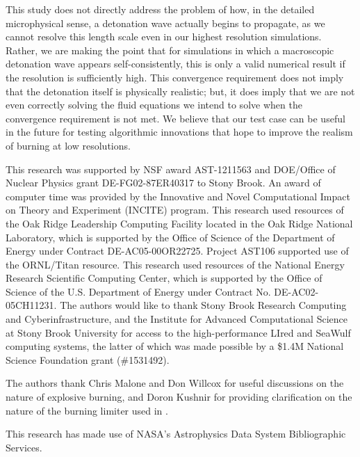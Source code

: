 \documentclass[twocolumn,numberedappendix,trackchanges]{../aastex62}
\newcommand{\amrex}{\texttt{AMReX}}
\newcommand{\castro}{\texttt{CASTRO}}
\newcommand{\yt}{\texttt{yt}}
\begin{document}
This study does not directly address the problem of how, in the detailed
microphysical sense, a detonation wave actually begins to propagate, as
we cannot resolve this length scale even in our highest resolution simulations.
Rather, we are making the point that for simulations in which a macroscopic
detonation wave appears self-consistently, this is only a valid numerical result
if the resolution is sufficiently high. This convergence requirement does
not imply that the detonation itself is physically realistic; but, it does
imply that we are not even correctly solving the fluid equations we intend
to solve when the convergence requirement is not met. We believe that our
test case can be useful in the future for testing algorithmic innovations
that hope to improve the realism of burning at low resolutions.



\acknowledgments

This research was supported by NSF award AST-1211563 and DOE/Office of
Nuclear Physics grant DE-FG02-87ER40317 to Stony Brook. An award of
computer time was provided by the Innovative and Novel Computational
Impact on Theory and Experiment (INCITE) program.  This research used
resources of the Oak Ridge Leadership Computing Facility located in
the Oak Ridge National Laboratory, which is supported by the Office of
Science of the Department of Energy under Contract
DE-AC05-00OR22725. Project AST106 supported use of the ORNL/Titan
resource.  This research used resources of the National Energy
Research Scientific Computing Center, which is supported by the Office
of Science of the U.S. Department of Energy under Contract
No. DE-AC02-05CH11231. The authors would like to thank Stony Brook
Research Computing and Cyberinfrastructure, and the Institute for
Advanced Computational Science at Stony Brook University for access
to the high-performance LIred and SeaWulf computing systems, the latter
of which was made possible by a \$1.4M National Science Foundation grant (\#1531492).

The authors thank Chris Malone and Don Willcox for useful discussions
on the nature of explosive burning, and Doron Kushnir for providing
clarification on the nature of the burning limiter used in \cite{kushnir:2013}.

This research has made use of NASA's Astrophysics Data System 
Bibliographic Services.

\software{\castro\ \citep{castro, astronum:2017},
          \amrex\ \citep{boxlib-tiling},
          \yt\ \citep{yt}
          }



\end{document}
